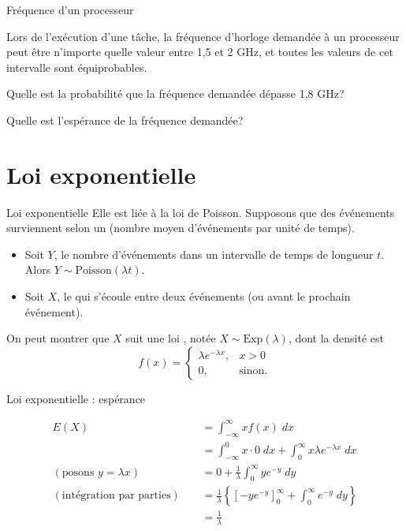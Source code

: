 \documentclass{BeamerTemplate}
\newcommand{\cibleReponse}{}
\newcommand{\lienreponse}[1]{\gdef\cibleReponse{#1}}
\begin{document}
\begin{frame}[t,label=exfreq]{Fréquence d'un processeur}

{\small
Lors de l'exécution d'une tâche, la fréquence d'horloge demandée à un processeur
peut être n'importe quelle valeur entre 1,5 et 2 GHz, et toutes les valeurs de cet
intervalle sont équiprobables.

Quelle est la probabilité que la fréquence demandée dépasse 1,8 GHz?

\vspace{1in}
Quelle est l'espérance de la fréquence demandée?
}
\lienreponse{rep-ex1}
\end{frame}

\section{Loi exponentielle}

\begin{frame}[t]{Loi exponentielle}
Elle est liée à la loi de Poisson. Supposons que des événements surviennent selon un
 (nombre moyen d'événements par unité de temps).
\begin{itemize}
\item Soit $Y$, le nombre d'événements dans un intervalle de temps de longueur $t$.
Alors $Y\sim\text{Poisson}(\lambda t)$.
\item Soit $X$, le  qui s'écoule entre deux événements (ou avant le prochain événement).
\end{itemize}

\medskip
On peut montrer que $X$ suit une loi , notée $X\sim\text{Exp}(\lambda)$,
dont la densité est
$$f(x)=\left\{\begin{array}{ll}
\lambda e^{-\lambda x}, & x>0\\
0, & \text{sinon.}
\end{array}\right.$$
\end{frame}


\begin{frame}[t]{Loi exponentielle : espérance}

{\small
\begin{align*}
E(X)&=\int_{-\infty}^\infty x f(x)\;dx\\
&=\int_{-\infty}^0 x\cdot 0\;dx+\int_0^\infty x\lambda e^{-\lambda x}\;dx\\
(\text{posons\ }y=\lambda x)\ \ \ \ \
&=0+\frac{1}{\lambda}\int_{0}^{\infty}ye^{-y}\;dy\\
(\text{intégration par parties})\ \ \ \ \
&=\frac{1}{\lambda}\left\{\left[-ye^{-y}\right]_0^\infty+\int_0^\infty e^{-y}\;dy\right\}\\
&=\frac{1}{\lambda}
\end{align*}
}
\end{frame}
\end{document}
